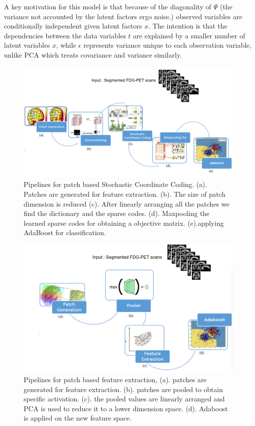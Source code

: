 A key motivation for this model is that because of the diagonality of $ \Psi $ (the variance not accounted by the latent factors ergo noise.) observed variables are conditionally independent given latent factors $ x $. The intention is that the dependencies between the data variables $t$ are explained by a smaller number of latent variables $x$, while $ \epsilon $ 
represents variance unique to
each observation variable, unlike PCA which treats covariance and variance similarly. 


\begin{figure}[h]
	\centering
	\includegraphics[width=\linewidth]{figures/pipeline1.png}
	\caption[Pipelines for Patch based Stochastic Coordinate Coding]{Pipelines for patch based Stochastic Coordinate Coding. (a). Patches are generated for feature extraction. (b). The size of patch dimension is reduced (c). After linearly arranging all the patches we find the dictionary and the sparse codes. (d). Maxpooling the learned sparse codes for obtaining a objective matrix. (e).applying AdaBoost for classification.}
	\label{fig:pipeline1}
\end{figure}

\begin{figure}[h]
	\centering
	\includegraphics[width=\linewidth]{figures/pipeline2.png}
	\caption[Pipelines for Patch based Feature Extraction]{Pipelines for patch based feature extraction, (a). patches are generated for feature extraction. (b). patches are pooled to obtain specific activation. (c). the pooled values are linearly arranged and PCA is used to reduce it to a lower dimension space. (d). Adaboost is applied on the new feature space.}
	\label{fig:pipeline2}
\end{figure}

